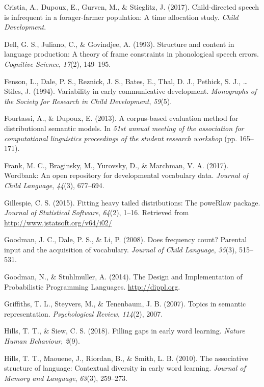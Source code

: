 \documentclass[english,floatsintext,man]{apa6}
\theoremstyle{definition}
\theoremstyle{definition}
\theoremstyle{definition}
\theoremstyle{remark}
\begin{document}
\hypertarget{ref-cristia2017}{}
Cristia, A., Dupoux, E., Gurven, M., \& Stieglitz, J. (2017).
Child-directed speech is infrequent in a forager-farmer population: A
time allocation study. \emph{Child Development}.

\hypertarget{ref-dell1993}{}
Dell, G. S., Juliano, C., \& Govindjee, A. (1993). Structure and content
in language production: A theory of frame constraints in phonological
speech errors. \emph{Cognitive Science}, \emph{17}(2), 149--195.

\hypertarget{ref-fenson94}{}
Fenson, L., Dale, P. S., Reznick, J. S., Bates, E., Thal, D. J.,
Pethick, S. J., \ldots{} Stiles, J. (1994). Variability in early
communicative development. \emph{Monographs of the Society for Research
in Child Development}, \emph{59}(5).

\hypertarget{ref-fourtassi2013}{}
Fourtassi, A., \& Dupoux, E. (2013). A corpus-based evaluation method
for distributional semantic models. In \emph{51st annual meeting of the
association for computational linguistics proceedings of the student
research workshop} (pp. 165--171).

\hypertarget{ref-frank2017}{}
Frank, M. C., Braginsky, M., Yurovsky, D., \& Marchman, V. A. (2017).
Wordbank: An open repository for developmental vocabulary data.
\emph{Journal of Child Language}, \emph{44}(3), 677--694.

\hypertarget{ref-gillespie15}{}
Gillespie, C. S. (2015). Fitting heavy tailed distributions: The
poweRlaw package. \emph{Journal of Statistical Software}, \emph{64}(2),
1--16. Retrieved from \url{http://www.jstatsoft.org/v64/i02/}

\hypertarget{ref-goodman2008}{}
Goodman, J. C., Dale, P. S., \& Li, P. (2008). Does frequency count?
Parental input and the acquisition of vocabulary. \emph{Journal of Child
Language}, \emph{35}(3), 515--531.

\hypertarget{ref-dippl}{}
Goodman, N., \& Stuhlmuller, A. (2014). The Design and Implementation of
Probabilistic Programming Languages. \url{http://dippl.org}.

\hypertarget{ref-griffiths07}{}
Griffiths, T. L., Steyvers, M., \& Tenenbaum, J. B. (2007). Topics in
semantic representation. \emph{Psychological Review}, \emph{114}(2),
2007.

\hypertarget{ref-hills2018}{}
Hills, T. T., \& Siew, C. S. (2018). Filling gaps in early word
learning. \emph{Nature Human Behaviour}, \emph{2}(9).

\hypertarget{ref-hills2010}{}
Hills, T. T., Maouene, J., Riordan, B., \& Smith, L. B. (2010). The
associative structure of language: Contextual diversity in early word
learning. \emph{Journal of Memory and Language}, \emph{63}(3), 259--273.
\end{document}
